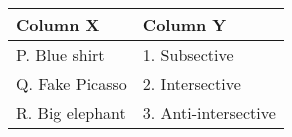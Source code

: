 \begin{tabular}{|l|l|}
        \hline
	Column X & Column Y \\
        \hline
        P. Blue shirt & 1. Subsective \\
        Q. Fake Picasso & 2. Intersective \\
        R. Big elephant & 3. Anti-intersective \\
        \hline
    \end{tabular}

